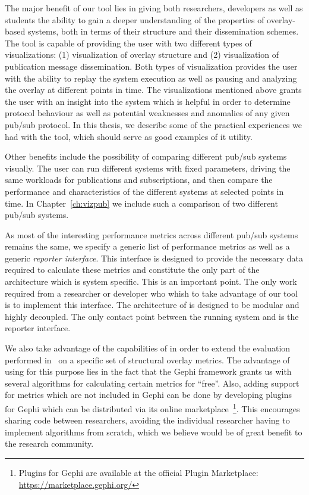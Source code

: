 The major benefit of our tool lies in giving both researchers, developers as
well as students the ability to gain a deeper understanding of the
properties of overlay-based systems, both in terms of their structure
and their dissemination schemes. The tool is capable of providing the
user with two different types of visualizations: (1) visualization of
overlay structure and (2) visualization of publication message
dissemination. Both types of visualization provides the user with the
ability to replay the system execution as well as pausing and analyzing the overlay at
different points in time. The visualizations mentioned above grants the user with an
insight into the system which is helpful in order to determine protocol
behaviour as well as potential weaknesses and anomalies of any given
pub/sub protocol. In this thesis, we describe some of the practical experiences we had
with the tool, which should serve as good examples of it utility.

Other benefits include the possibility of comparing different pub/sub
systems visually. The user can run different systems with fixed
parameters, driving the same workloads for publications and
subscriptions, and then compare the performance and characteristics of
the different systems at selected points in time. In
Chapter~\ref{ch:vizpub} we include such a comparison of two different
pub/sub systems.

As most of the interesting performance metrics across different pub/sub
systems remains the same, we specify a generic list of performance
metrics as well as a generic \emph{reporter interface}. This interface
is designed to provide the necessary data required to calculate these
metrics and constitute the only part of the architecture which is system
specific. This is an important point. The only work required from a
researcher or developer who whish to take advantage of our tool is to
implement this interface. The architecture of \demo{} is designed to be
modular and highly decoupled. The only contact point between the
running system and \demo{} is the reporter interface.

We also take advantage of the capabilities of \demo{} in order to extend
the evaluation performed in~\cite{Setty:2012} on a specific set of
structural overlay metrics. The advantage of using \demo{} for this
purpose lies in the fact that the Gephi framework grants us with
several algorithms for calculating certain metrics for ``free''. Also, adding
support for metrics which are not included in Gephi can be done by
developing plugins for Gephi which can be distributed via its online
marketplace~\footnote{Plugins for Gephi are available at the official
    Plugin Marketplace: \url{https://marketplace.gephi.org/}}. This encourages sharing code between
researchers, avoiding the individual researcher having to implement algorithms from scratch, which
we believe would be of great benefit to the research community.


